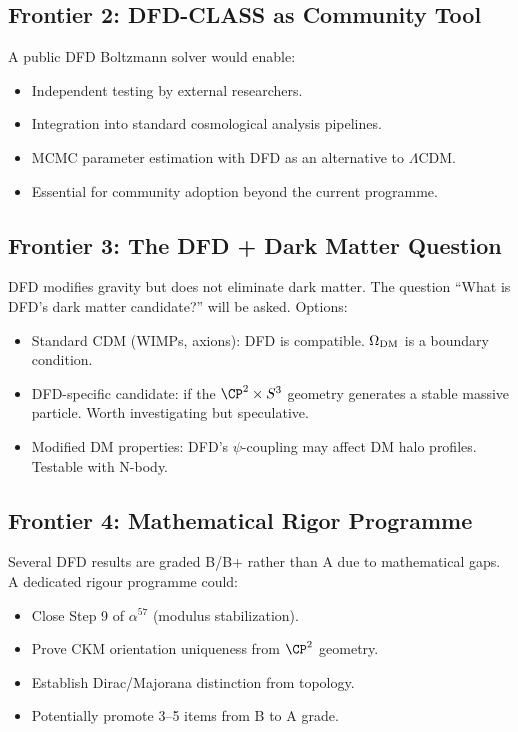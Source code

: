 \documentclass[11pt,a4paper]{article}
\begin{document}
\subsection{Frontier 2: DFD-CLASS as Community Tool}
A public DFD Boltzmann solver would enable:
\begin{itemize}[nosep]
\item Independent testing by external researchers.
\item Integration into standard cosmological analysis pipelines.
\item MCMC parameter estimation with DFD as an alternative to $\Lambda$CDM.
\item Essential for community adoption beyond the current programme.
\end{itemize}

\subsection{Frontier 3: The DFD + Dark Matter Question}
DFD modifies gravity but does not eliminate dark matter. The question ``What is DFD's dark matter candidate?'' will be asked. Options:
\begin{itemize}[nosep]
\item Standard CDM (WIMPs, axions): DFD is compatible. $\Omega_{\rm DM}$ is a boundary condition.
\item DFD-specific candidate: if the $\CP^2 \times S^3$ geometry generates a stable massive particle. Worth investigating but speculative.
\item Modified DM properties: DFD's $\psi$-coupling may affect DM halo profiles. Testable with N-body.
\end{itemize}

\subsection{Frontier 4: Mathematical Rigor Programme}
Several DFD results are graded B/B+ rather than A due to mathematical gaps. A dedicated rigour programme could:
\begin{itemize}[nosep]
\item Close Step 9 of $\alpha^{57}$ (modulus stabilization).
\item Prove CKM orientation uniqueness from $\CP^2$ geometry.
\item Establish Dirac/Majorana distinction from topology.
\item Potentially promote 3--5 items from B to A grade.
\end{itemize}
\end{document}
